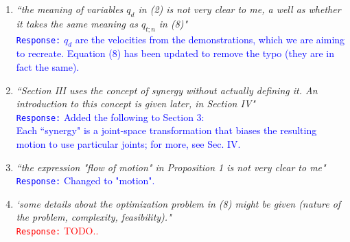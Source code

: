 \documentclass[10pt,stdletter,dateno]{newlfm}
\begin{document}
\begin{newlfm}
\begin{enumerate}
\item \textit{``the meaning of variables $q_d$ in (2) is not very clear to me, a well as whether it takes the same meaning
as $q_{t;n}$ in (8)"}\\
\textcolor{blue}{\texttt{Response:} \small $q_d$ are the velocities from the demonstrations, which we are aiming to recreate. Equation (8) has been updated to remove the typo (they are in fact the same).}\\

\item \textit{``Section III uses the concept of synergy without actually defining it. An introduction to this concept is given later, in Section IV"}\\
\textcolor{blue}{\texttt{Response:} \small Added the following to Section 3:\\
Each ``synergy" is a joint-space transformation that biases the resulting motion to use particular joints; for more, see Sec. IV.}\\

\item \textit{``the expression "flow of motion" in Proposition 1 is not very clear to me"}\\
\textcolor{blue}{\texttt{Response:} \small Changed to "motion".}\\

\item \textit{`some details about the optimization problem in (8) might be given
(nature of the problem, complexity, feasibility)."}\\
\textcolor{red}{\texttt{Response:} \small TODO..}\\



\end{enumerate}


\end{newlfm}
\end{document}
